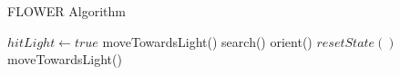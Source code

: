 \documentclass{article}
\begin{document}
\begin{algorithm}
\caption{FLOWER Algorithm}\label{euclid}
\begin{algorithmic}[1]
\State $hitLight \gets \textit{true}$
\EndIf
\Return moveTowardsLight()
 \Return search()
 \Return orient()
\Else 
\State $resetState()$
\State \Return moveTowardsLight()
\EndIf
\end{algorithmic}
\end{algorithm}
\end{document}
